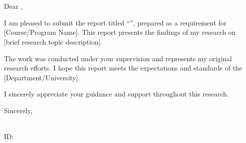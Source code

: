 
\clearpage
{}
{}

\vspace{1em}

\noindent
\ReportDate

\vspace{1em}

\noindent
\ReportSupervisor \\
\ReportDepartment \\
\ReportUniversity

\vspace{1em}

\noindent
Dear \ReportSupervisor,

\vspace{0.5em}

I am pleased to submit the report titled ``\ReportTitle{}'', prepared as
a requirement for [Course/Program Name]. This report presents the findings
of my research on [brief research topic description].

The work was conducted under your supervision and represents my original
research efforts. I hope this report meets the expectations and standards
of the [Department/University].

I sincerely appreciate your guidance and support throughout this research.

\vspace{1.5cm}

\noindent
Sincerely,

\vspace{0.5cm}

\noindent
\ReportAuthor{} \\
ID: \ReportAuthorId{} \\
\ReportUniversity
